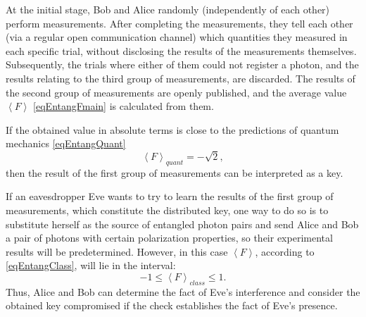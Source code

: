 At the initial stage, Bob and Alice randomly (independently of each other) perform measurements. After completing the measurements, they tell each other (via a regular open communication channel) which quantities they measured in each specific trial, without disclosing the results of the measurements themselves. Subsequently, the trials where either of them could not register a photon, and the results relating to the third group of measurements, are discarded. The results of the second group of measurements are openly published, and the average value $\left<F\right>$ \eqref{eqEntangFmain} is calculated from them.

If the obtained value in absolute terms is close to the predictions of quantum mechanics \eqref{eqEntangQuant}
\[
\left<F\right>_{quant} = - \sqrt{2},
\]
then the result of the first group of measurements can be interpreted as a key.

If an eavesdropper Eve wants to try to learn the results of the first group of measurements, which constitute the distributed key, one way to do so is to substitute herself as the source of entangled photon pairs and send Alice and Bob a pair of photons with certain polarization properties, so their experimental results will be predetermined. However, in this case $\left<F\right>$, according to \eqref{eqEntangClass}, will lie in the interval:
\[
-1 \le \left<F\right>_{class} \le 1.
\]
Thus, Alice and Bob can determine the fact of Eve's interference and consider the obtained key compromised if the check establishes the fact of Eve's presence.